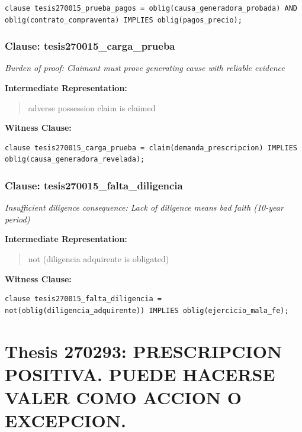 \documentclass[11pt,a4paper]{article}
\begin{document}
\begin{lstlisting}[style=witnessstyle, language=Witness]
clause tesis270015_prueba_pagos = oblig(causa_generadora_probada) AND oblig(contrato_compraventa) IMPLIES oblig(pagos_precio);
\end{lstlisting}

\subsubsection{Clause: tesis270015\_carga\_prueba}

\textit{Burden of proof: Claimant must prove generating cause with reliable evidence}

\textbf{Intermediate Representation:}

\begin{quote}
adverse possession claim is claimed
\end{quote}

\textbf{Witness Clause:}

\begin{lstlisting}[style=witnessstyle, language=Witness]
clause tesis270015_carga_prueba = claim(demanda_prescripcion) IMPLIES oblig(causa_generadora_revelada);
\end{lstlisting}

\subsubsection{Clause: tesis270015\_falta\_diligencia}

\textit{Insufficient diligence consequence: Lack of diligence means bad faith (10-year period)}

\textbf{Intermediate Representation:}

\begin{quote}
not (diligencia adquirente is obligated)
\end{quote}

\textbf{Witness Clause:}

\begin{lstlisting}[style=witnessstyle, language=Witness]
clause tesis270015_falta_diligencia = not(oblig(diligencia_adquirente)) IMPLIES oblig(ejercicio_mala_fe);
\end{lstlisting}

\newpage

\section{Thesis 270293: PRESCRIPCION POSITIVA. PUEDE HACERSE VALER COMO ACCION O EXCEPCION.}
\label{thesis:270293}
\end{document}
